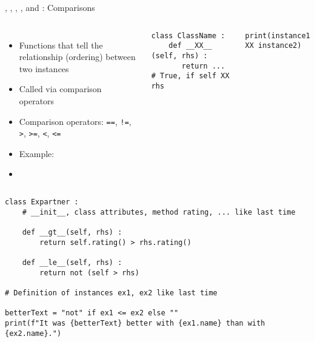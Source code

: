 \begin{frame}[fragile]{, , , ,  and : Comparisons}
%
\begin{columns}[T]
\begin{itemize}
\item Functions that tell the relationship (ordering) between two instances
\item Called via comparison operators
\item Comparison operators: \texttt{==}, \texttt{!=}, \texttt{>}, \texttt{>=}, \texttt{<}, \texttt{<=}
\item Example:  
\item[\Thus] 
\end{itemize}
%
\vspace{-6pt}
\begin{codebox}
\begin{verbatim}
class ClassName :
    def __XX__ (self, rhs) :
       return ... # True, if self XX rhs
\end{verbatim}
\end{codebox}
%
\begin{codebox}
\begin{verbatim}
print(instance1 XX instance2)
\end{verbatim}
\end{codebox}
\end{columns}
%
\end{frame}


\begin{frame}[fragile]
%
\begin{codebox}
\begin{verbatim}
class Expartner :
    # __init__, class attributes, method rating, ... like last time
    
    def __gt__(self, rhs) :
        return self.rating() > rhs.rating()
    
    def __le__(self, rhs) :
        return not (self > rhs)

# Definition of instances ex1, ex2 like last time

betterText = "not" if ex1 <= ex2 else ""
print(f"It was {betterText} better with {ex1.name} than with {ex2.name}.")
\end{verbatim}
\end{codebox}
%
\end{frame}

